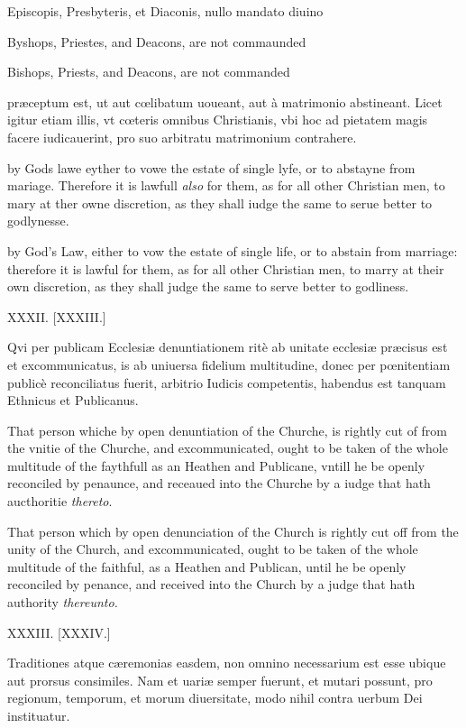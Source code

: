 Episcopis, Presbyteris, et Diaconis, nullo mandato diuino

Byshops, Priestes, and Deacons, are not commaunded

Bishops, Priests, and Deacons, are not commanded

præceptum est, ut aut cœlibatum uoueant, aut à matrimonio abstineant. Licet igitur etiam illis, vt cœteris omnibus Christianis, vbi hoc ad pietatem magis facere iudicauerint, pro suo arbitratu matrimonium contrahere.

by Gods lawe eyther to vowe the estate of single lyfe, or to abstayne from mariage. Therefore it is lawfull \emph{also} for them, as for all other Christian men, to mary at ther owne discretion, as they shall iudge the same to serue better to godlynesse.

by God's Law, either to vow the estate of single life, or to abstain from marriage: therefore it is lawful for them, as for all other Christian men, to marry at their own discretion, as they shall judge the same to serve better to godliness.

XXXII. [XXXIII.]


Qvi per publicam Ecclesiæ denuntiationem ritè ab unitate ecclesiæ præcisus est et excommunicatus, is ab uniuersa fidelium multitudine, donec per pœnitentiam publicè reconciliatus fuerit, arbitrio Iudicis competentis, habendus est tanquam Ethnicus et Publicanus.

That person whiche by open denuntiation of the Churche, is rightly cut of from the vnitie of the Churche, and excommunicated, ought to be taken of the whole multitude of the faythfull as an Heathen and Publicane, vntill he be openly reconciled by penaunce, and receaued into the Churche by a iudge that hath aucthoritie \emph{thereto}.

That person which by open denunciation of the Church is rightly cut off from the unity of the Church, and excommunicated, ought to be taken of the whole multitude of the faithful, as a Heathen and Publican, until he be openly reconciled by penance, and received into the Church by a judge that hath authority \emph{thereunto.}

XXXIII. [XXXIV.]


Traditiones atque cæremonias easdem, non omnino necessarium est esse ubique aut prorsus consimiles. Nam et uariæ semper fuerunt, et mutari possunt, pro regionum, temporum, et morum diuersitate, modo nihil contra uerbum Dei instituatur.

